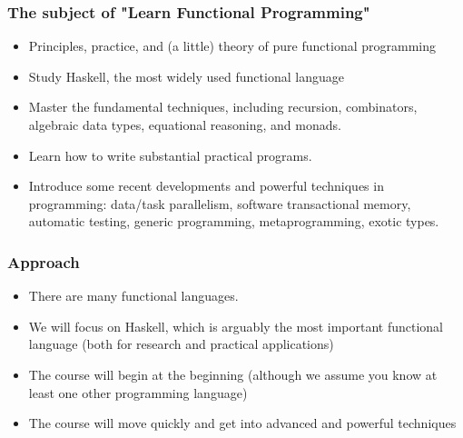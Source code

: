 \documentclass{beamer}
\begin{document}
\begin{frame}
\frametitle{The subject of "Learn Functional Programming"}

\begin{itemize}
\item Principles, practice, and (a little) theory of pure
  functional programming
\item Study Haskell, the most widely used functional language
\item Master the fundamental techniques, including recursion,
  combinators, algebraic data types, equational reasoning, and
  monads.
\item Learn how to write substantial practical programs.
\item Introduce some recent developments and powerful techniques in
  programming: data/task parallelism, software transactional
  memory, automatic testing, generic programming, metaprogramming,
  exotic types.
\end{itemize}
\end{frame}
\begin{frame}
\frametitle{Approach}

\begin{itemize}
\item There are many functional languages.
\item We will focus on Haskell, which is arguably the most
  important functional language (both for research and practical
  applications)
\item The course will begin at the beginning (although we assume you know at least one other programming language)
\item The course will move quickly and get into advanced and powerful
  techniques

\end{itemize}

\end{frame}

\end{document}
